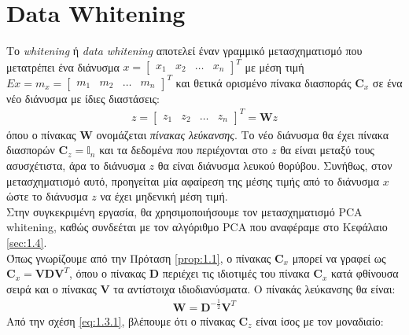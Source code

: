 \section{\en Data Whitening} \label{sec:1.5}
\justifying
Το \en \emph{whitening} \gr ή \en \emph{data whitening}\cite{whiten:5} \gr αποτελεί έναν γραμμικό μετασχηματισμό που μετατρέπει ένα διάνυσμα \en $x = \begin{bmatrix} x_1 & x_2 & \ldots & x_n \end{bmatrix} ^T$ \gr με μέση τιμή \en $ E{x} = m_x = \begin{bmatrix} m_1 & m_2 & \ldots & m_n \end{bmatrix}^T$ \gr και θετικά ορισμένο πίνακα διασποράς \en $ \mathbf{C}_x$ \gr σε ένα νέο διάνυσμα με ίδιες διαστάσεις: \en
\begin{align*}
    z = \begin{bmatrix} z_1 & z_2 & \ldots & z_n \end{bmatrix}^T = \mathbf{W} z
\end{align*}
\gr όπου ο πίνακας \en $\mathbf{W}$ \gr ονομάζεται \emph{πίνακας λεύκανσης}. Το νέο διάνυσμα θα έχει πίνακα διασπορών \en $ \mathbf{C}_z = \mathbb{I}_n$ \gr και τα δεδομένα που περιέχονται στο \en $z$ \gr θα είναι μεταξύ τους ασυσχέτιστα, άρα το διάνυσμα \en $z$ \gr θα είναι διάνυσμα λευκού θορύβου. Συνήθως, στον μετασχηματισμό αυτό, προηγείται μία αφαίρεση της μέσης τιμής από το διάνυσμα \en $x$ \gr ώστε το διάνυσμα \en $z$ \gr να έχει μηδενική μέση τιμή.
\\ [0.5 \baselineskip]
Στην συγκεκριμένη εργασία, θα χρησιμοποιήσουμε τον μετασχηματισμό \en PCA whitening, \gr καθώς συνδεέται με τον αλγόριθμο \en PCA \gr που αναφέραμε στο Κεφάλαιο \ref{sec:1.4}.
\\
Όπως γνωρίζουμε από την Πρόταση \ref{prop:1.1}, ο πίνακας \en $\mathbf{C}_x$ \gr μπορεί να γραφεί ως \en $\mathbf{C}_x = \mathbf{V} \mathbf{D} \mathbf{V}^T$, \gr όπου ο πίνακας \en $\mathbf{D}$ \gr περιέχει τις ιδιοτιμές του πίνακα \en $\mathbf{C}_x$ \gr κατά φθίνουσα σειρά και ο πίνακας \en $\mathbf{V}$ \gr τα αντίστοιχα ιδιοδιανύσματα. Ο πίνακάς λεύκανσης θα είναι: \en
\begin{align} \label{eq:1.3.1}
    \mathbf{W} = \mathbf{D}^{- \frac{1}{2}} \mathbf{V}^T
\end{align}
\gr Από την σχέση \eqref{eq:1.3.1}, βλέπουμε ότι ο πίνακας \en $\mathbf{C}_z$ \en είναι ίσος με τον μοναδιαίο: \en
